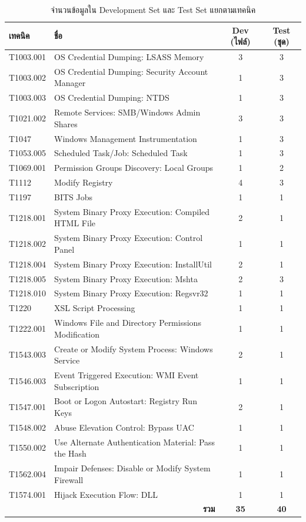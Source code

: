 \begin{table}[ht]
  \centering
  \caption{จำนวนข้อมูลใน Development Set และ Test Set แยกตามเทคนิค}
  \label{tab:dev-test}
  \small
  \begin{tabular}{|l|l|c|c|}
    \hline
    \textbf{เทคนิค} & \textbf{ชื่อ} & \textbf{Dev (ไฟล์)} & \textbf{Test (ชุด)} \\ \hline
    T1003.001 & OS Credential Dumping: LSASS Memory & 3 & 3 \\ \hline
    T1003.002 & OS Credential Dumping: Security Account Manager & 1 & 3 \\ \hline
    T1003.003 & OS Credential Dumping: NTDS & 1 & 3 \\ \hline
    T1021.002 & Remote Services: SMB/Windows Admin Shares & 3 & 3 \\ \hline
    T1047     & Windows Management Instrumentation & 1 & 3 \\ \hline
    T1053.005 & Scheduled Task/Job: Scheduled Task & 1 & 3 \\ \hline
    T1069.001 & Permission Groups Discovery: Local Groups & 1 & 2 \\ \hline
    T1112     & Modify Registry & 4 & 3 \\ \hline
    T1197     & BITS Jobs & 1 & 1 \\ \hline
    T1218.001 & System Binary Proxy Execution: Compiled HTML File & 2 & 1 \\ \hline
    T1218.002 & System Binary Proxy Execution: Control Panel & 1 & 1 \\ \hline
    T1218.004 & System Binary Proxy Execution: InstallUtil & 2 & 1 \\ \hline
    T1218.005 & System Binary Proxy Execution: Mshta & 2 & 3 \\ \hline
    T1218.010 & System Binary Proxy Execution: Regsvr32 & 1 & 1 \\ \hline
    T1220     & XSL Script Processing & 1 & 1 \\ \hline
    T1222.001 & Windows File and Directory Permissions Modification & 1 & 1 \\ \hline
    T1543.003 & Create or Modify System Process: Windows Service & 2 & 1 \\ \hline
    T1546.003 & Event Triggered Execution: WMI Event Subscription & 1 & 1 \\ \hline
    T1547.001 & Boot or Logon Autostart: Registry Run Keys & 2 & 1 \\ \hline
    T1548.002 & Abuse Elevation Control: Bypass UAC & 1 & 1 \\ \hline
    T1550.002 & Use Alternate Authentication Material: Pass the Hash & 1 & 1 \\ \hline
    T1562.004 & Impair Defenses: Disable or Modify System Firewall & 1 & 1 \\ \hline
    T1574.001 & Hijack Execution Flow: DLL & 1 & 1 \\ \hline
    \multicolumn{2}{|r|}{\textbf{รวม}} & \textbf{35} & \textbf{40} \\ \hline
  \end{tabular}
\end{table}

